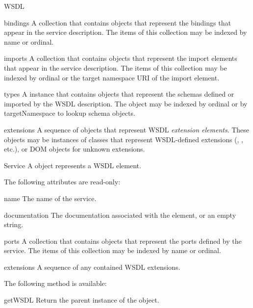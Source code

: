 \begin{classdesc}{WSDL}{}
\begin{memberdesc}{bindings}
A collection that contains  objects that represent the 
bindings that appear in the service description. The items of this 
collection may be indexed by name or ordinal. 
\end{memberdesc}

\begin{memberdesc}{imports}
A collection that contains  objects that represent the 
import elements that appear in the service description. The items of this 
collection may be indexed by ordinal or the target namespace URI of the 
import element.
\end{memberdesc}

\begin{memberdesc}{types}
A  instance that contains  objects that 
represent the schemas defined or imported by the WSDL description. The 
 object may be indexed by ordinal or by targetNamespace to 
lookup schema objects.
\end{memberdesc}

\begin{memberdesc}{extensions}
A sequence of objects that represent WSDL \emph{extension elements}. These 
objects may be instances of classes that represent WSDL-defined extensions 
(, , etc.), or DOM  
objects for unknown extensions.
\end{memberdesc}

\end{classdesc}

\begin{classdesc}{Service}{}
A  object represents a WSDL  element.

The following attributes are read-only:

\begin{memberdesc}{name}
The name of the service.
\end{memberdesc}

\begin{memberdesc}{documentation}
The documentation associated with the element, or an empty string.
\end{memberdesc}

\begin{memberdesc}{ports}
A collection that contains  objects that represent the 
ports defined by the service. The items of this collection may be indexed 
by name or ordinal. 
\end{memberdesc}

\begin{memberdesc}{extensions}
A sequence of any contained WSDL extensions.
\end{memberdesc}

The following method is available:

\begin{methoddesc}{getWSDL}{}
Return the parent  instance of the object.
\end{methoddesc}

\end{classdesc}


